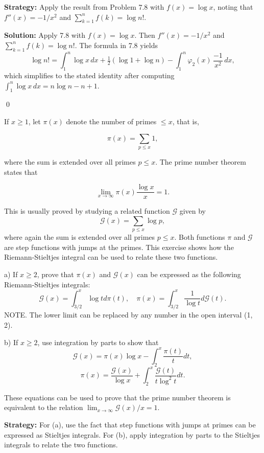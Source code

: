 \noindent\textbf{Strategy:} Apply the result from Problem 7.8 with $f(x) = \log x$, noting that $f''(x) = -1/x^2$ and $\sum_{k=1}^n f(k) = \log n!$.

\bigskip\noindent\textbf{Solution:}
Apply 7.8 with $f(x)=\log x$. Then $f''(x)=-1/x^2$ and $\sum_{k=1}^n f(k)=\log n!$. The formula in 7.8 yields
\[\log n!= \int_1^n \log x\,dx + \tfrac12(\log 1+\log n) - \int_1^n \varphi_2(x)\,\frac{-1}{x^2}\,dx,
\]
which simplifies to the stated identity after computing $\int_1^n \log x\,dx = n\log n - n + 1$.




\qed
\begin{problembox}
If $x \geq 1$, let $\pi(x)$ denote the number of primes $\leq x$, that is,

\[ \pi(x) = \sum_{p \leq x} 1, \]

where the sum is extended over all primes $p \leq x$. The prime number theorem states that

\[ \lim_{x \to \infty} \pi(x) \frac{\log x}{x} = 1. \]

This is usually proved by studying a related function $\mathcal{G}$ given by
\[\mathcal{G}(x) = \sum_{p \leq x} \log p,\]
where again the sum is extended over all primes $p \leq x$. Both functions $\pi$ and $\mathcal{G}$ are step functions with jumps at the primes. This exercise shows how the Riemann-Stieltjes integral can be used to relate these two functions.

a) If $x \geq 2$, prove that $\pi(x)$ and $\mathcal{G}(x)$ can be expressed as the following Riemann-Stieltjes integrals:
\[\mathcal{G}(x) = \int_{3/2}^{x} \log t d\pi(t), \quad \pi(x) = \int_{3/2}^{x} \frac{1}{\log t} d\mathcal{G}(t).\]
NOTE. The lower limit can be replaced by any number in the open interval (1, 2).

b) If $x \geq 2$, use integration by parts to show that
\[\mathcal{G}(x) = \pi(x) \log x - \int_{2}^{x} \frac{\pi(t)}{t} dt,\]
\[\pi(x) = \frac{\mathcal{G}(x)}{\log x} + \int_{2}^{x} \frac{\mathcal{G}(t)}{t \log^{2} t} dt.\]

These equations can be used to prove that the prime number theorem is equivalent to the relation $\lim_{x \to \infty} \mathcal{G}(x)/x = 1$.
\end{problembox}

\noindent\textbf{Strategy:} For (a), use the fact that step functions with jumps at primes can be expressed as Stieltjes integrals. For (b), apply integration by parts to the Stieltjes integrals to relate the two functions.

